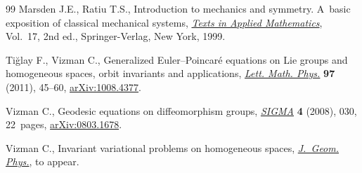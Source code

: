 \documentclass[pdftex]{sigma}
\numberwithin{equation}{section}
\begin{document}
\begin{thebibliography}{99}
Marsden J.E., Ratiu T.S., Introduction to mechanics and symmetry. A~basic
  exposition of classical mecha\-ni\-cal systems, \href{http://dx.doi.org/10.1007/978-0-387-21792-5}{\textit{Texts in Applied
  Mathematics}}, Vol.~17, 2nd ed., Springer-Verlag, New York, 1999.

Ti{\u{g}}lay F., Vizman C., Generalized {E}uler--{P}oincar\'e equations on
  {L}ie groups and homogeneous spaces, orbit invariants and applications,
  \href{http://dx.doi.org/10.1007/s11005-011-0464-2}{\textit{Lett. Math. Phys.}} \textbf{97} (2011), 45--60, \href{http://arxiv.org/abs/1008.4377}{arXiv:1008.4377}.

Vizman C., Geodesic equations on dif\/feomorphism groups, \href{http://dx.doi.org/10.3842/SIGMA.2008.030}{\textit{SIGMA}}
  \textbf{4} (2008), 030, 22~pages, \href{http://arxiv.org/abs/0803.1678}{arXiv:0803.1678}.

Vizman C., Invariant variational problems on homogeneous spaces,
  \href{http://dx.doi.org/10.1016/j.geomphys.2014.10.012}{\textit{J.~Geom. Phys.}}, {t}o appear.

\end{thebibliography}\LastPageEnding
\end{document}
